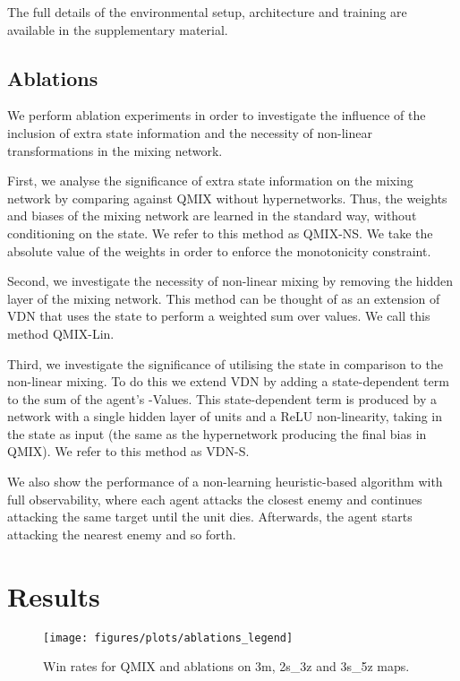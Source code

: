 \documentclass{article}
\begin{document}
The full details of the environmental setup, architecture and training are available in the supplementary material.
 





\subsection{Ablations} 
\label{sub:abl}

We perform ablation experiments in order to investigate the influence of the inclusion of extra state information and the necessity of non-linear transformations in the mixing network. 

First, we analyse the significance of extra state information on the mixing network by comparing against QMIX without hypernetworks. Thus, the weights and biases of the mixing network are learned in the standard way, without conditioning on the state. We refer to this method as QMIX-NS. We take the absolute value of the weights in order to enforce the monotonicity constraint.

Second, we investigate the necessity of non-linear mixing by removing the hidden layer of the mixing network. This method can be thought of as an extension of VDN that uses the state  to perform a weighted sum over  values. We call this method QMIX-Lin.

Third, we investigate the significance of utilising the state  in comparison to the non-linear mixing. To do this we extend VDN by adding a state-dependent term to the sum of the agent's -Values. This state-dependent term is produced by a network with a single hidden layer of  units and a ReLU non-linearity, taking in the state  as input (the same as the hypernetwork producing the final bias in QMIX). We refer to this method as VDN-S.

We also show the performance of a non-learning heuristic-based algorithm with full observability, where each agent attacks the closest enemy and continues attacking the same target until the unit dies. Afterwards, the agent starts attacking the nearest enemy and so forth. 



 \section{Results}
\label{sec:results}

\begin{figure*}[htb!]
    \centering
    \texttt{[image: figures/plots/ablations\_legend]}
    \vfill
    \caption{Win rates for QMIX and ablations on 3m, 2s\_3z and 3s\_5z maps.}
    \label{fig:starcraft_ablations}
\end{figure*}
\end{document}
